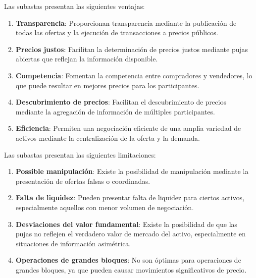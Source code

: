 \begin{teorema}
Las subastas presentan las siguientes ventajas:

\begin{enumerate}
\item \textbf{Transparencia}: Proporcionan transparencia mediante la publicación de todas las ofertas y la ejecución de transacciones a precios públicos.

\item \textbf{Precios justos}: Facilitan la determinación de precios justos mediante pujas abiertas que reflejan la información disponible.

\item \textbf{Competencia}: Fomentan la competencia entre compradores y vendedores, lo que puede resultar en mejores precios para los participantes.

\item \textbf{Descubrimiento de precios}: Facilitan el descubrimiento de precios mediante la agregación de información de múltiples participantes.

\item \textbf{Eficiencia}: Permiten una negociación eficiente de una amplia variedad de activos mediante la centralización de la oferta y la demanda.
\end{enumerate}
\end{teorema}

\begin{proposicion}
Las subastas presentan las siguientes limitaciones:

\begin{enumerate}
\item \textbf{Possible manipulación}: Existe la posibilidad de manipulación mediante la presentación de ofertas falsas o coordinadas.

\item \textbf{Falta de liquidez}: Pueden presentar falta de liquidez para ciertos activos, especialmente aquellos con menor volumen de negociación.

\item \textbf{Desviaciones del valor fundamental}: Existe la posibilidad de que las pujas no reflejen el verdadero valor de mercado del activo, especialmente en situaciones de información asimétrica.

\item \textbf{Operaciones de grandes bloques}: No son óptimas para operaciones de grandes bloques, ya que pueden causar movimientos significativos de precio.
\end{enumerate}
\end{proposicion}

